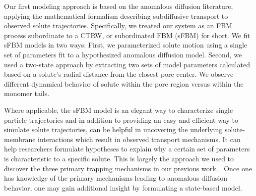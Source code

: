 \documentclass{article}
\begin{document}
  Our first modeling approach is based on the anomalous diffusion literature, 
  applying the mathematical formalism describing subdiffusive transport to observed
  solute trajectories. Specifically, we treated our system as an FBM process subordinate
  to a CTRW, or subordinated FBM (sFBM) for short. We fit sFBM
  models in two ways: 
  First, we parameterized solute motion using a single set of parameters fit
  to a hypothesized anomalous diffusion model. Second, we used a two-state approach
  by extracting two sets of model parameters calculated based on a solute's radial
  distance from the closest pore center. We observe different dynamical behavior of
  solute within the pore region versus within the monomer tails.
  
  Where applicable, the sFBM model is an elegant way to characterize single 
  particle trajectories and in addition to providing an easy and efficient way to 
  simulate solute trajectories, can be helpful in uncovering the underlying 
  solute-membrane interactions which result in observed transport mechanisms.
  It can help researchers formulate hypotheses to explain why a certain set of
  parameters is characteristic to a specific solute. This is largely the approach
  we used to discover the three primary trapping mechanisms in our previous work.~\cite{coscia_chemically_2019}
  Once one has knowledge of the primary mechanisms leading to anomalous diffusion
  behavior, one may gain additional insight by formulating a state-based model.
  
  
\end{document}
